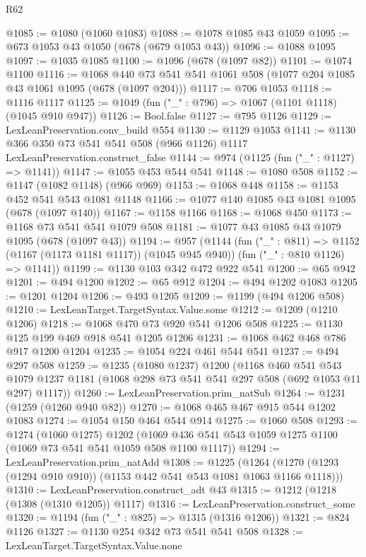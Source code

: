 \begin{lexlean}{R62}
\begin{coremodule}
@1085 := @1080 (@1060 @1083)
@1088 := @1078 @1085 @43 @1059
@1095 := @673 @1053 @43 @1050 (@678 (@679 @1053 @43))
@1096 := @1088 @1095
@1097 := @1035 @1085
@1100 := @1096 (@678 (@1097 @82))
@1101 := @1074 @1100
@1116 := @1068 @440 @73 @541 @541 @1061 @508 (@1077 @204 @1085 @43 @1061 @1095 (@678 (@1097 @204)))
@1117 := @706 @1053
@1118 := @1116 @1117
@1125 := @1049 (fun ("_" : @796) => @1067 (@1101 @1118) (@1045 @910 @947))
@1126 := Bool.false
@1127 := @795 @1126
@1129 := LexLeanPreservation.conv_build @554
@1130 := @1129 @1053
@1141 := @1130 @366 @350 @73 @541 @541 @508 (@966 @1126) @1117 LexLeanPreservation.construct_false
@1144 := @974 (@1125 (fun ("_" : @1127) => @1141))
@1147 := @1055 @453 @544 @541
@1148 := @1080 @508
@1152 := @1147 (@1082 @1148) (@966 @969)
@1153 := @1068 @448
@1158 := @1153 @452 @541 @543 @1081 @1148
@1166 := @1077 @140 @1085 @43 @1081 @1095 (@678 (@1097 @140))
@1167 := @1158 @1166
@1168 := @1068 @450
@1173 := @1168 @73 @541 @541 @1079 @508
@1181 := @1077 @43 @1085 @43 @1079 @1095 (@678 (@1097 @43))
@1194 := @957
    (@1144
      (fun ("_" : @811) => @1152 (@1167 (@1173 @1181 @1117)) (@1045 @945 @940))
      (fun ("_" : @810 @1126) => @1141))
@1199 := @1130 @103 @342 @472 @922 @541
@1200 := @65 @942
@1201 := @494 @1200
@1202 := @65 @912
@1204 := @494 @1202 @1083
@1205 := @1201 @1204
@1206 := @493 @1205
@1209 := @1199 (@494 @1206 @508)
@1210 := LexLeanTarget.TargetSyntax.Value.some
@1212 := @1209 (@1210 @1206)
@1218 := @1068 @470 @73 @920 @541 @1206 @508
@1225 := @1130 @125 @199 @469 @918 @541 @1205 @1206
@1231 := @1068 @462 @468 @786 @917 @1200 @1204
@1235 := @1054 @224 @461 @544 @541
@1237 := @494 @297 @508
@1259 := @1235
    (@1080 @1237)
    @1200
    (@1168
      @460
      @541
      @543
      @1079
      @1237
      @1181
      (@1068 @298 @73 @541 @541 @297 @508 (@692 @1053 @11 @297) @1117))
@1260 := LexLeanPreservation.prim_natSub
@1264 := @1231 (@1259 (@1260 @940 @82))
@1270 := @1068 @465 @467 @915 @544 @1202 @1083
@1274 := @1054 @150 @464 @544 @914
@1275 := @1060 @508
@1293 := @1274
    (@1060 @1275)
    @1202
    (@1069 @436 @541 @543 @1059 @1275 @1100 (@1069 @73 @541 @541 @1059 @508 @1100 @1117))
@1294 := LexLeanPreservation.prim_natAdd
@1308 := @1225
    (@1264 (@1270 (@1293 (@1294 @910 @910)) (@1153 @442 @541 @543 @1081 @1063 @1166 @1118)))
@1310 := LexLeanPreservation.construct_adt @43
@1315 := @1212 (@1218 (@1308 (@1310 @1205)) @1117)
@1316 := LexLeanPreservation.construct_some
@1320 := @1194 (fun ("_" : @825) => @1315 (@1316 @1206))
@1321 := @824 @1126
@1327 := @1130 @254 @342 @73 @541 @541 @508
@1328 := LexLeanTarget.TargetSyntax.Value.none

\end{coremodule}
\end{lexlean}
